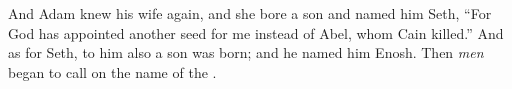 
\bverse And Adam knew his wife again, and she bore a son and named him Seth, ``For God has appointed another seed for me instead of Abel, whom Cain killed.''
\bverse And as for Seth, to him also a son was born; and he named him Enosh. Then \textit{men} began to call on the name of the \lord.
